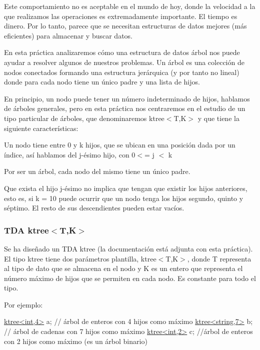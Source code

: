 Este comportamiento no es aceptable en el mundo de hoy, donde la velocidad a la que realizamos las operaciones es extremadamente importante. El tiempo es dinero. Por lo tanto, parece que se necesitan estructuras de datos mejores (más eficientes) para almacenar y buscar datos.

En esta práctica analizaremos cómo una estructura de datos árbol nos puede ayudar a resolver algunos de nuestros problemas. Un árbol es una colección de nodos conectados formando una estructura jerárquica (y por tanto no lineal) donde para cada nodo tiene un único padre y una lista de hijos.

En principio, un nodo puede tener un número indeterminado de hijos, hablamos de árboles generales, pero en esta práctica nos centraremos en el estudio de un tipo particular de árboles, que denominaremos ktree$<$\+T,\+K$>$ y que tiene la siguiente características\+:

\begin{DoxyItemize}
\item Un nodo tiene entre 0 y k hijos, que se ubican en una posición dada por un índice, así hablamos del j-\/ésimo hijo, con 0$<$= j $<$ k \item Por ser un árbol, cada nodo del mismo tiene un único padre. \item Que exista el hijo j-\/ésimo no implica que tengan que existir los hijos anteriores, esto es, si k = 10 puede ocurrir que un nodo tenga los hijos segundo, quinto y séptimo. El resto de sus descendientes pueden estar vacíos.\end{DoxyItemize}
\hypertarget{index_tdaktree}{}\subsubsection{T\+D\+A ktree$<$\+T,\+K$>$}\label{index_tdaktree}
Se ha diseñado un T\+DA ktree (la documentación está adjunta con esta práctica). El tipo ktree tiene dos parámetros plantilla, ktree$<$\+T,\+K$>$, donde T representa al tipo de dato que se almacena en el nodo y K es un entero que representa el número máximo de hijos que se permiten en cada nodo. Es constante para todo el tipo.

Por ejemplo\+:


\begin{DoxyCode}
\hyperlink{classktree}{ktree<int,4>} a; \textcolor{comment}{// árbol de enteros con 4 hijos como máximo}
\hyperlink{classktree}{ktree<string,7>} b; \textcolor{comment}{// árbol de cadenas con 7 hijos como máximo}
\hyperlink{classktree}{ktree<int,2>} c; \textcolor{comment}{//árbol de enteros con 2 hijos como máximo (es un árbol binario)}
\end{DoxyCode}


